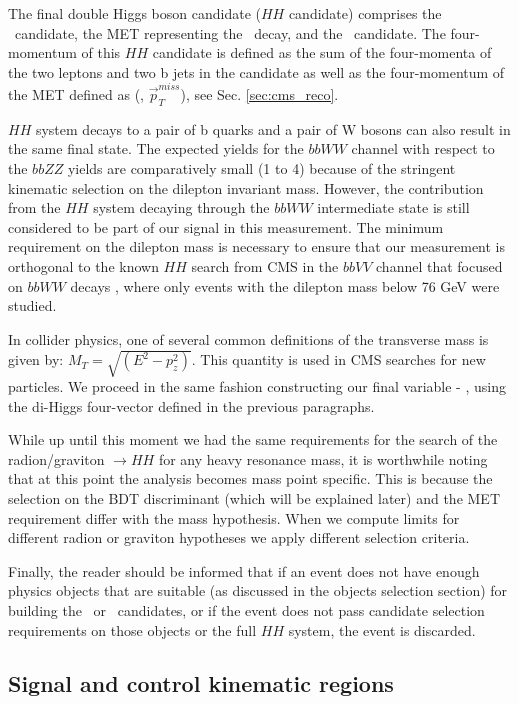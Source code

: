 The final double Higgs boson candidate ($HH$ candidate) comprises the \Zll~candidate, the MET representing the \Znn~decay, and the \HBB~candidate. The four-momentum of this $HH$ candidate is defined as the sum of the four-momenta of the two leptons and two b jets in the candidate as well as the four-momentum of the MET defined as (\ETslash, $\vec{p}^{miss}_T$), see Sec. \ref{sec:cms_reco}.


$HH$ system decays to a pair of b quarks and a pair of W bosons can also result in the same final state. The expected yields for the $bbWW$ channel with respect to the $bbZZ$ yields are comparatively small (1 to 4) because of the stringent kinematic selection on the dilepton invariant mass. However, the contribution from the $HH$ system decaying through the $bbWW$ intermediate state is still considered to be part of our signal in this measurement. The minimum requirement on the dilepton mass is necessary to ensure that our measurement is orthogonal to the known $HH$ search from CMS in the $bbVV$ channel that focused on $bbWW$ decays \cite{bbWW}, where only events with the dilepton mass below 76 GeV were studied.

In collider physics, one of several common definitions of the transverse mass is given by: $M_T=\sqrt{( E^2- p_z^2)}$. This quantity is  used in CMS searches for new particles. We proceed in the same fashion constructing our final variable - \mTHH, using the di-Higgs four-vector defined in the previous paragraphs. 

While up until this moment we had the same requirements for the search of the radion/graviton $\to HH$ for any heavy resonance mass, it is worthwhile noting that at this point the analysis becomes mass point specific. This is because the selection on the BDT discriminant (which will be explained later) and the MET requirement differ with the mass hypothesis. When we compute limits for different radion or graviton hypotheses we apply different selection criteria. 

Finally, the reader should be informed that if an event does not have enough physics objects that are suitable (as discussed in the objects selection section) for building the \Zll~or \HBB~candidates, or if the event does not pass candidate selection requirements on those objects or the full $HH$ system, the event is discarded.

\subsection{Signal and control kinematic regions}

